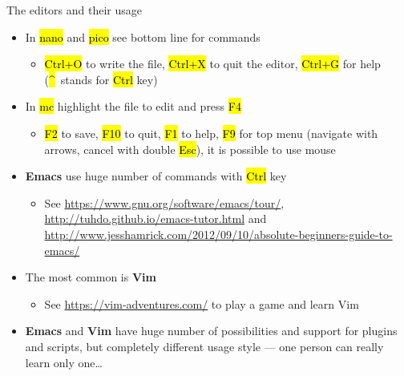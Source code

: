 \documentclass[compress, ucs, xelatex, 11pt, xcolor=svgnames,
  hyperref={
    bookmarks=true,
    unicode=true,
    colorlinks=true,
    pdftitle={Linux, command line and MetaCentrum},
    plainpages=false,
    pdfauthor={Vojtech Zeisek},
    pdfsubject={Course about use of Linux command line, writing shell scripts and using MetaCentrum of CESNET},
    pdfcreator={XeLaTeX},
    pdfkeywords={Linux, GNU, BASH, shell, command line, MetaCentrum},
    linkcolor=DarkRed,
    anchorcolor=DarkBlue,
    citecolor=Indigo,
    filecolor=NavyBlue,
    menucolor=DarkMagenta,
    urlcolor=DarkBlue,
    pdftex},
  url={hyphens, lowtilde} %
  ]{beamer}
\renewcommand{\texttt}[1]{\hl{\ttfamily #1}}
\begin{document}
\begin{frame}{The editors and their usage}
  \begin{itemize}
    \item In \texttt{nano} and \texttt{pico} see bottom line for commands
    \begin{itemize}
      \item \texttt{Ctrl+O} to write the file, \texttt{Ctrl+X} to quit the editor, \texttt{Ctrl+G} for help (\texttt{\textasciicircum}~stands for \texttt{Ctrl} key)
    \end{itemize}
    \item In \texttt{mc} highlight the file to edit and press \texttt{F4}
    \begin{itemize}
      \item \texttt{F2} to save, \texttt{F10} to quit, \texttt{F1} to help, \texttt{F9} for top menu (navigate with arrows, cancel with double \texttt{Esc}), it is possible to use mouse
    \end{itemize}
    \item \textbf{Emacs} use huge number of commands with \texttt{Ctrl} key
    \begin{itemize}
      \item See \url{https://www.gnu.org/software/emacs/tour/}, \url{http://tuhdo.github.io/emacs-tutor.html} and \url{http://www.jesshamrick.com/2012/09/10/absolute-beginners-guide-to-emacs/}
    \end{itemize}
    \item The most common is \textbf{Vim}
    \begin{itemize}
      \item See \url{https://vim-adventures.com/} to play a game and learn Vim
    \end{itemize}
    \item \textbf{Emacs} and \textbf{Vim} have huge number of possibilities and support for plugins and scripts, but completely different usage style --- one person can really learn only one\ldots
  \end{itemize}
\end{frame}
\end{document}
